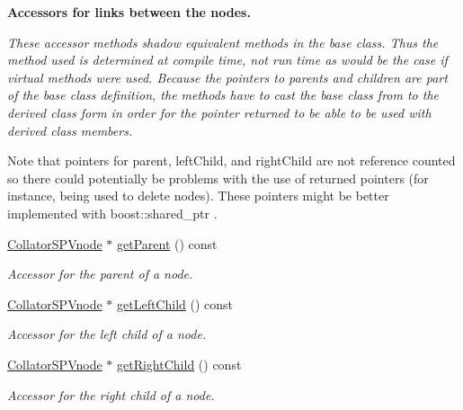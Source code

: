 \begin{Indent}{\bf \-Accessors for links between the nodes.}\par
{\em \-These accessor methods shadow equivalent methods in the base class. \-Thus the method used is determined at compile time, not run time as would be the case if virtual methods were used. \-Because the pointers to parents and children are part of the base class definition, the methods have to cast the base class from to the derived class form in order for the pointer returned to be able to be used with derived class members.

\-Note that pointers for parent, left\-Child, and right\-Child are not reference counted so there could potentially be problems with the use of returned pointers (for instance, being used to delete nodes). \-These pointers might be better implemented with boost\-::shared\-\_\-ptr . }\begin{DoxyCompactItemize}
\item 
\hyperlink{classsubpavings_1_1CollatorSPVnode}{\-Collator\-S\-P\-Vnode} $\ast$ \hyperlink{classsubpavings_1_1CollatorSPVnode_a635b2b0884e6d8fc328e058bd3fadbcc}{get\-Parent} () const 
\begin{DoxyCompactList}\small\item\em \-Accessor for the parent of a node. \end{DoxyCompactList}\item 
\hyperlink{classsubpavings_1_1CollatorSPVnode}{\-Collator\-S\-P\-Vnode} $\ast$ \hyperlink{classsubpavings_1_1CollatorSPVnode_aeaea28b3b2d7ca59a28cd3fbb3438cce}{get\-Left\-Child} () const 
\begin{DoxyCompactList}\small\item\em \-Accessor for the left child of a node. \end{DoxyCompactList}\item 
\hyperlink{classsubpavings_1_1CollatorSPVnode}{\-Collator\-S\-P\-Vnode} $\ast$ \hyperlink{classsubpavings_1_1CollatorSPVnode_aaaa6264c4020a5e0ccfdedb19228fa2b}{get\-Right\-Child} () const 
\begin{DoxyCompactList}\small\item\em \-Accessor for the right child of a node. \end{DoxyCompactList}\end{DoxyCompactItemize}
\end{Indent}
